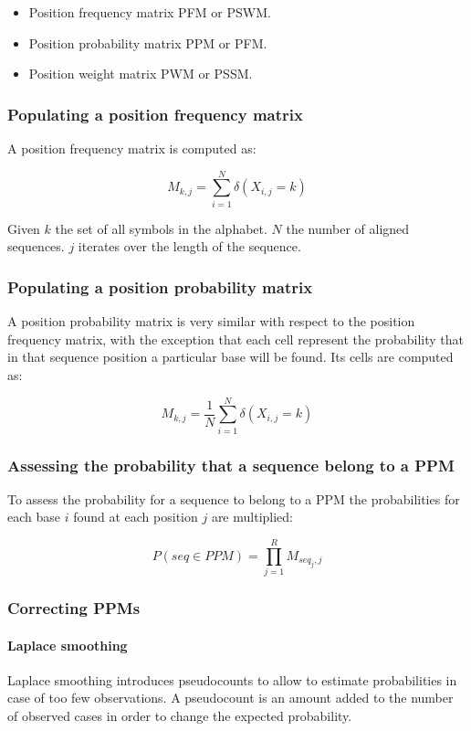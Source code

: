 	\begin{multicols}{2}
		\begin{itemize}
			\item Position frequency matrix PFM or PSWM.
			\item Position probability matrix PPM or PFM.
			\item Position weight matrix PWM or PSSM.
		\end{itemize}
	\end{multicols}

		\subsubsection{Populating a position frequency matrix}
		A position frequency matrix is computed as:

		$$M_{k,j} = \sum\limits_{i=1}^N\delta(X_{i,j} = k)$$

		Given $k$ the set of all symbols in the alphabet.
		$N$ the number of aligned sequences.
		$j$ iterates over the length of the sequence.

		\subsubsection{Populating a position probability matrix}
		A position probability matrix is very similar with respect to the position frequency matrix, with the exception that each cell represent the probability that in that sequence position a particular base will be found.
		Its cells are computed as:

		$$M_{k,j} = \frac{1}{N}\sum\limits_{i=1}^N\delta(X_{i,j} = k)$$

		\subsubsection{Assessing the probability that a sequence belong to a PPM}
		To assess the probability for a sequence to belong to a PPM the probabilities for each base $i$ found at each position $j$ are multiplied:

		$$P(seq\in PPM) = \prod\limits_{j=1}^R M_{seq_j, j}$$

		\subsubsection{Correcting PPMs}

			\paragraph{Laplace smoothing}
			Laplace smoothing introduces pseudocounts to allow to estimate probabilities in case of too few observations.
			A pseudocount is an amount added to the number of observed cases in order to change the expected probability.

